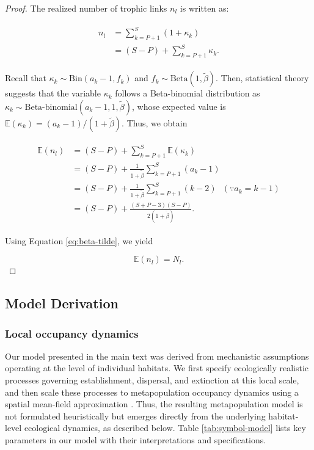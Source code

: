 \documentclass[11pt, class=article, crop=false]{standalone}
\theoremstyle{definition}
\begin{document}
\begin{proof}
    The realized number of trophic links $n_l$ is written as:

    \begin{align}
        \begin{split}
            n_l &= \sum_{k = P + 1}^{S}(1 + \kappa_k)\\ 
                &= (S - P) + \sum_{k = P + 1}^{S} \kappa_k.
        \end{split}
    \end{align}

    Recall that $\kappa_k \sim \mathrm{Bin}(a_k - 1, f_k)$ and $f_k \sim \mathrm{Beta}(1, \tilde{\beta})$.
    Then, statistical theory suggests that the variable $\kappa_k$ follows a Beta-binomial distribution as $\kappa_k \sim \mbox{Beta-binomial}(a_k - 1, 1, \tilde{\beta})$, whose expected value is $\mathbb{E}(\kappa_k) = (a_k - 1) / (1 + \tilde{\beta})$.
    Thus, we obtain

    \begin{align}
    \begin{split}
        \mathbb{E}(n_l) 
        &= (S - P) + \sum_{k = P + 1}^{S} \mathbb{E}(\kappa_k)\\
        &= (S - P) + \frac{1}{1 + \tilde{\beta}} \sum_{k = P + 1}^{S} (a_k - 1)\\
        &= (S - P) + \frac{1}{1 + \tilde{\beta}} \sum_{k = P + 1}^{S} (k - 2)~~~(\because a_k = k - 1)\\
        &= (S - P) + \frac{(S + P - 3)(S - P)}{2 (1 + \tilde{\beta})}.
    \end{split}
    \end{align}

    Using Equation \ref{eq:beta-tilde}, we yield

    \begin{equation}
        \mathbb{E}(n_l)  = N_l.
    \end{equation}
    
\end{proof}

\newpage

\subsection{Model Derivation}

\subsubsection{Local occupancy dynamics}
Our model presented in the main text was derived from mechanistic assumptions operating at the level of individual habitats.
We first specify ecologically realistic processes governing establishment, dispersal, and extinction at this local scale, and then scale these processes to metapopulation occupancy dynamics using a spatial mean-field approximation \citep{ovaskainen_asymptotically_2006}.
Thus, the resulting metapopulation model is not formulated heuristically but emerges directly from the underlying habitat-level ecological dynamics, as described below.
Table \ref{tab:symbol-model} lists key parameters in our model with their interpretations and specifications.
\end{document}
